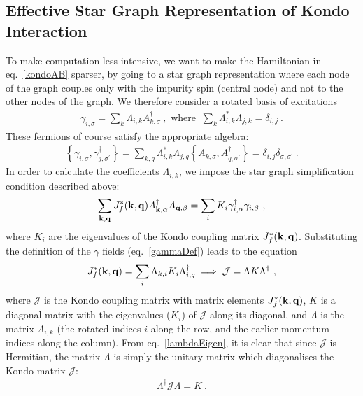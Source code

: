 \subsection*{Effective Star Graph Representation of Kondo Interaction}
To make computation less intensive, we want to make the Hamiltonian in eq.~\ref{kondoAB} sparser, by going to a star graph representation where each node of the graph couples only with the impurity spin (central node) and not to the other nodes of the graph. We therefore consider a rotated basis of excitations
\begin{equation}\begin{aligned}\label{gammaDef}
	\gamma_{i,\sigma}^\dagger = \sum_{k}\Lambda_{i, k} A^\dagger_{k,\sigma}~,\text{ where }~\sum_{k}\Lambda^*_{i, k}\Lambda_{j, k} = \delta_{i,j}~.
\end{aligned}\end{equation}
These fermions of course satisfy the appropriate algebra:
\begin{equation}\begin{aligned}
	\left\{\gamma_{i,\sigma}, \gamma^\dagger_{j,\sigma^\prime}\right\} = \sum_{k, q}\Lambda^*_{i, k}\Lambda_{j, q} \left\{A_{k,\sigma}, A_{q,\sigma^\prime}^\dagger\right\} = \delta_{i, j}\delta_{\sigma,\sigma^\prime}~.
\end{aligned}\end{equation}
In order to calculate the coefficients \(\Lambda_{i, k}\), we impose the star graph simplification condition described above:
\begin{equation}\begin{aligned}
	\sum_{{\bf k}, {\bf q}} J_f^*({\bf k},{\bf q}) A^\dagger_{{\bf k},\alpha}A_{{\bf q},\beta} = \sum_i K_i \gamma^\dagger_{i,\alpha}\gamma_{i,\beta}~,
\end{aligned}\end{equation}
where \(K_i\) are the eigenvalues of the Kondo coupling matrix \(J_f^*({\bf k},{\bf q})\). Substituting the definition of the \(\gamma\) fields (eq.~\ref{gammaDef}) leads to the equation
\begin{equation}\begin{aligned}\label{lambdaEigen}
	J_f^*({\bf k},{\bf q}) = \sum_i \Lambda_{k, i} K_i \Lambda^\dagger_{i,q} \implies \mathcal{J} = \Lambda K \Lambda^\dagger~,
\end{aligned}\end{equation}
where \(\mathcal{J}\) is the Kondo coupling matrix with matrix elements \(J_f^*({\bf k},{\bf q})\), \(K\) is a diagonal matrix with the eigenvalues (\(K_i\)) of \(\mathcal{J}\) along its diagonal, and \(\Lambda\) is the matrix \(\Lambda_{i, k}\) (the rotated indices \(i\) along the row, and the earlier momentum indices along the column). From eq.~\ref{lambdaEigen}, it is clear that since \(\mathcal{J}\) is Hermitian, the matrix \(\Lambda\) is simply the unitary matrix which diagonalises the Kondo matrix \(\mathcal{J}\):
\begin{equation}\begin{aligned}
\Lambda^\dagger \mathcal{J} \Lambda = K~.
\end{aligned}\end{equation}


